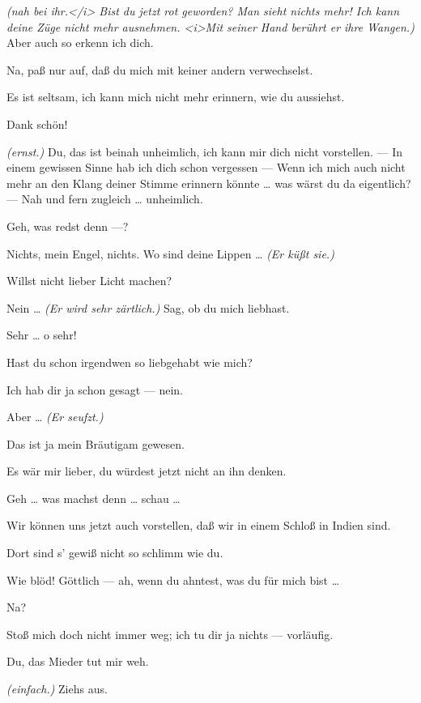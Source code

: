 \documentclass[
	final,
	a4paper,
	ngerman,
	mpinclude = true, %
	twoside = true,
	open = right,
	cleardoublepage = plain,
	DIV = 13,
	BCOR = 1cm,
	titlepage = firstiscover,
	]{scrbook}
\newcommand{\direction}[1]{\textit{(#1)}}
\newcommand{\thecharacter}[1]{\textup{\textsc{#1}}\xspace}
\newcommand{\thesuesse}{\thecharacter{Süßes Mädel}}
\newcommand{\thedichter}{\thecharacter{Dichter}}
\newcommand{\character}[1]{\item[#1:]}
\newcommand{\suesse}{\character{\thesuesse}}
\newcommand{\dichter}{\character{\thedichter}}
\begin{document}
\begin{play}
	\dichter
	\direction{nah bei ihr.</i> Bist du jetzt rot geworden? Man sieht nichts mehr! Ich kann deine Züge nicht mehr ausnehmen. <i>Mit seiner Hand berührt er ihre Wangen.} Aber auch so erkenn ich dich.

	\suesse
	Na, paß nur auf, daß du mich mit keiner andern verwechselst.

	\dichter
	Es ist seltsam, ich kann mich nicht mehr erinnern, wie du aussiehst.

	\suesse
	Dank schön!

	\dichter
	\direction{ernst.} Du, das ist beinah unheimlich, ich kann mir dich nicht vorstellen. --- In einem gewissen Sinne hab ich dich schon vergessen --- Wenn ich mich auch nicht mehr an den Klang deiner Stimme erinnern könnte \ldots{} was wärst du da eigentlich? --- Nah und fern zugleich \ldots{} unheimlich.

	\suesse
	Geh, was redst denn ---?

	\dichter
	Nichts, mein Engel, nichts. Wo sind deine Lippen \ldots{} \direction{Er küßt sie.}

	\suesse
	Willst nicht lieber Licht machen?

	\dichter
	Nein \ldots{} \direction{Er wird sehr zärtlich.} Sag, ob du mich liebhast.

	\suesse
	Sehr \ldots{} o sehr!

	\dichter
	Hast du schon irgendwen so liebgehabt wie mich?

	\suesse
	Ich hab dir ja schon gesagt --- nein.

	\dichter
	Aber \ldots{} \direction{Er seufzt.}

	\suesse
	Das ist ja mein Bräutigam gewesen.

	\dichter
	Es wär mir lieber, du würdest jetzt nicht an ihn denken.

	\suesse
	Geh \ldots{} was machst denn \ldots{} schau \ldots{}

	\dichter
	Wir können uns jetzt auch vorstellen, daß wir in einem Schloß in Indien sind.

	\suesse
	Dort sind s' gewiß nicht so schlimm wie du.

	\dichter
	Wie blöd! Göttlich --- ah, wenn du ahntest, was du für mich bist \ldots{}

	\suesse
	Na?

	\dichter
	Stoß mich doch nicht immer weg; ich tu dir ja nichts --- vorläufig.

	\suesse
	Du, das Mieder tut mir weh.

	\dichter
	\direction{einfach.} Ziehs aus.


\end{play}
\end{document}
